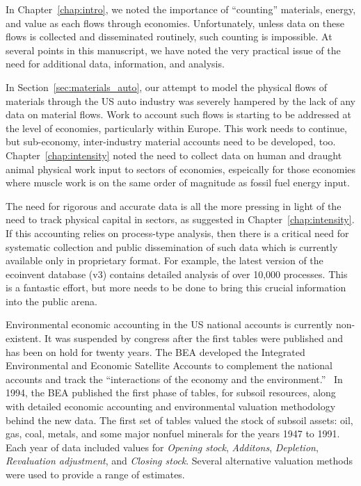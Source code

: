 In Chapter~\ref{chap:intro}, 
we noted the importance of ``counting''
materials, energy, and value as each flows through economies.  
Unfortunately, unless data on these flows 
is collected and disseminated routinely, 
such counting is impossible.
At several points in this manuscript,
we have noted the very practical issue of the
need for additional data, information, and analysis.

In Section~\ref{sec:materials_auto},
our attempt to model the physical flows of 
materials through the US auto industry was
severely hampered by the lack of any data on
material flows.
Work to account such flows is starting to be
addressed at the level of economies,
particularly within Europe.\cite{EUROSTAT2011}
This work needs to continue, but
sub-economy, inter-industry material accounts need to be developed, too.
Chapter~\ref{chap:intensity} noted the need to collect
data on human and draught animal physical work input to 
sectors of economies, espeically for those economies where 
muscle work is on the same order of magnitude 
as fossil fuel energy input.

The need for rigorous and accurate data
is all the more pressing in light of the need 
to track physical capital in sectors,
as suggested in Chapter~\ref{chap:intensity}.
If this accounting relies on process-type
analysis,
then there is a critical need for systematic
collection and public dissemination of such data
which is currently available only in proprietary format.
For example, the latest version of the ecoinvent database (v3)
contains detailed analysis of over 10,000 
processes.\cite{EcoInvent2012}
This is a fantastic effort, but more needs to be
done to bring this crucial information into the public arena.

Environmental economic accounting in the US national accounts is currently non-existent. 
It was suspended by congress after the first
tables were published and has been on hold for twenty years. 
The BEA developed the
Integrated Environmental and Economic Satellite Accounts 
to complement the national accounts and track the 
``interactions of the economy and the environment.''~\cite[p.~33]{BEA1994a} 
In 1994, the BEA published the first phase of tables, for subsoil resources, 
along with detailed economic accounting 
and environmental valuation methodology behind the new data.\cite{BEA1994a, BEA1994b} 
The first set of tables valued the stock of
subsoil assets: oil, gas, coal, metals, 
and some major nonfuel minerals for the years 1947 to 1991. Each
year of data included values for \emph{Opening stock}, 
\emph{Additons}, \emph{Depletion}, \emph{Revaluation adjustment}, 
and \emph{Closing stock}. 
Several alternative valuation methods were used to provide a range of estimates.

